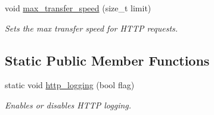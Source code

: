 \begin{DoxyCompactItemize}
\mbox{\label{class_vessel_1_1_networking_1_1_http_client_a9446438a103e2690a51996c8032278c3}} 
void \hyperlink{class_vessel_1_1_networking_1_1_http_client_a9446438a103e2690a51996c8032278c3}{max\+\_\+transfer\+\_\+speed} (size\+\_\+t limit)
\begin{DoxyCompactList}\small\item\em Sets the max transfer speed for H\+T\+TP requests. \end{DoxyCompactList}\end{DoxyCompactItemize}
\subsection*{Static Public Member Functions}
\begin{DoxyCompactItemize}
\item 
\mbox{\label{class_vessel_1_1_networking_1_1_http_client_a50c01c4bbf1e2ef74caea768ad3f4401}} 
static void \hyperlink{class_vessel_1_1_networking_1_1_http_client_a50c01c4bbf1e2ef74caea768ad3f4401}{http\+\_\+logging} (bool flag)
\begin{DoxyCompactList}\small\item\em Enables or disables H\+T\+TP logging. \end{DoxyCompactList}\end{DoxyCompactItemize}
